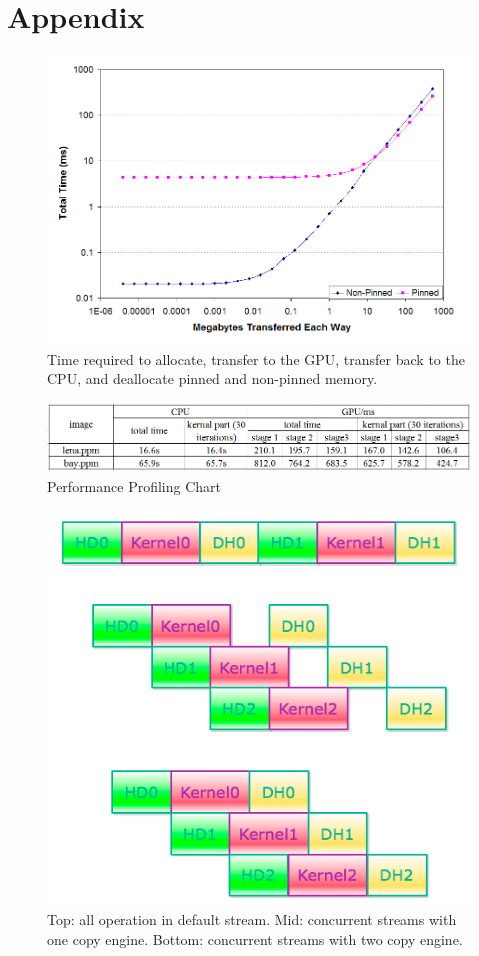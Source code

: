 \documentclass[journal,11pt,onecolumn,draftclsnofoot]{ieeeconf}  %
\begin{document}
\section{Appendix}
\begin{figure}[h]
	\centering\includegraphics[width=120mm]{pinned_trade_off.png}
	\caption{Time required to allocate, transfer to the GPU, transfer back to the CPU, and deallocate pinned and non-pinned memory.\cite{Trade_off}}
	\label{Time required to allocate, transfer to the GPU, transfer back to the CPU, and deallocate pinned and non-pinned memory.}
\end{figure}
\begin{figure}[h]
	\centering
	\includegraphics[width=170mm]{table.png}
	\caption{Performance Profiling Chart}
	\label{table}
\end{figure}
\begin{figure}[h]
	\centering\includegraphics[width=120mm]{concurrent.png}
	\caption{Top: all operation in default stream. Mid: concurrent streams with one copy engine. Bottom: concurrent streams with two copy engine.}
	\label{concurrent}
\end{figure}
\end{document}
